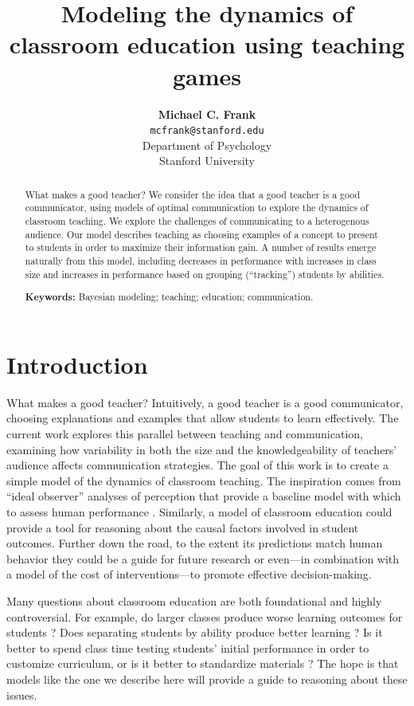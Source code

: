 \documentclass[10pt,letterpaper]{article}
\title{Modeling the dynamics of classroom education using teaching games}
\author{{\large \bf Michael C. Frank} \\
  \texttt{mcfrank@stanford.edu} \\
  Department of Psychology\\
  Stanford University}
\begin{document}
\maketitle

\begin{abstract}
What makes a good teacher? We consider the idea that a good teacher is a good communicator, using models of optimal communication to explore the dynamics of classroom teaching. We explore the challenges of communicating to a heterogenous audience. Our model describes teaching as choosing examples of a concept to present to students in order to maximize their information gain. A number of results emerge naturally from this model, including decreases in performance with increases in class size and increases in performance based on grouping (``tracking'') students by abilities.

\textbf{Keywords:} 
Bayesian modeling; teaching; education; communication.
\end{abstract}

\section{Introduction}

What makes a good teacher? Intuitively, a good teacher is a good communicator, choosing explanations and examples that allow students to learn effectively. The current work explores this parallel between teaching and communication, examining how variability in both the size and the knowledgeability of teachers' audience affects communication strategies. The goal of this work is to create a simple model of the dynamics of classroom teaching. The inspiration comes from ``ideal observer'' analyses of perception that provide a baseline model with which to assess human performance \cite{geisler2003,frank2013}. Similarly, a model of classroom education
could provide a tool for reasoning about the causal factors involved in student outcomes. Further down the road, to the extent its predictions match human behavior they could be a guide for future research or even---in combination with a model of the cost of interventions---to promote effective decision-making. 

Many questions about classroom education are both foundational and highly controversial. For example, do larger classes produce worse learning outcomes for students \cite{glass1979,slavin1989}? Does separating students by ability produce better learning \cite{slavin1987,wheelock1992}? Is it better to spend class time testing students' initial performance in order to customize curriculum, or is it better to standardize materials \cite{fuchs1986}? The hope is that models like the one we describe here will provide a guide to reasoning about these issues.
\end{document}

